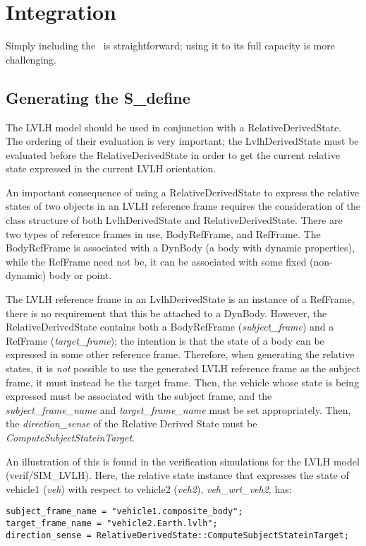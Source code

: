 %
%
% 
%

 \section{Integration}
Simply including the \LVLHDesc\ is straightforward; using it to its full capacity is more challenging.

\subsection{Generating the S\_define}

The LVLH model should be used in conjunction with a RelativeDerivedState.  The ordering of their evaluation is very important; the LvlhDerivedState must be evaluated before the RelativeDerivedState in order to get the current relative state expressed in the current LVLH orientation.

An important consequence of using a RelativeDerivedState to express the relative states of two objects in an LVLH reference frame requires the consideration of the class structure of both LvlhDerivedState and RelativeDerivedState.  There are two types of reference frames in use, BodyRefFrame, and RefFrame.  The BodyRefFrame is associated with a DynBody (a body with dynamic properties), while the RefFrame need not be, it can be associated with some fixed (non-dynamic) body or point.

The LVLH reference frame in an LvlhDerivedState is an instance of a RefFrame, there is no requirement that this be attached to a DynBody.  However, the RelativeDerivedState contains both a BodyRefFrame (\textit{subject\_frame}) and a RefFrame (\textit{target\_frame}); the intention is that the state of a body can be expressed in some other reference frame. Therefore, when generating the relative states, it is \textit{not} possible to use the generated LVLH reference frame as the subject frame, it must instead be the target frame.  Then, the vehicle whose state is being expressed must be associated with the subject frame, and the \textit{subject\_frame\_name} and \textit{target\_frame\_name} must be set appropriately.  Then, the \textit{direction\_sense} of the Relative Derived State must be \textit{ComputeSubjectStateinTarget}.

An illustration of this is found in the verification simulations for the LVLH model (verif/SIM\_LVLH).  Here, the relative state instance that expresses the state of vehicle1 (\textit{veh}) with respect to vehicle2 (\textit{veh2}), \textit{veh\_wrt\_veh2}, has:
\begin{verbatim}
subject_frame_name = "vehicle1.composite_body";
target_frame_name = "vehicle2.Earth.lvlh";
direction_sense = RelativeDerivedState::ComputeSubjectStateinTarget;
\end{verbatim}

